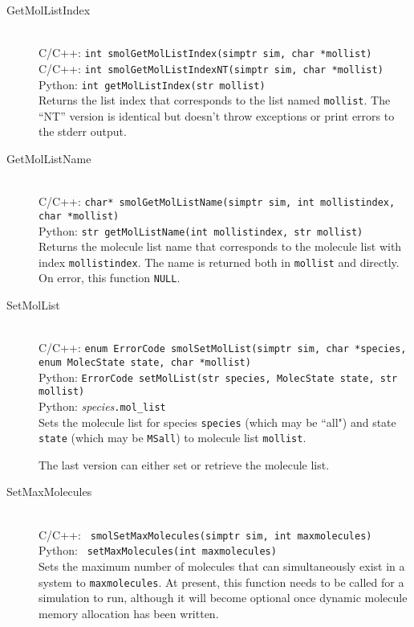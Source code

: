 \documentclass {scrbook}
\newcommand {\ttt} {\texttt}
\begin{document}
\begin{description}
\item[GetMolListIndex]
\hfill \\
C/C++: \ttt{int smolGetMolListIndex(simptr sim, char *mollist)}\\
C/C++: \ttt{int smolGetMolListIndexNT(simptr sim, char *mollist)}\\
Python: \ttt{int getMolListIndex(str mollist)}\\
Returns the list index that corresponds to the list named \ttt{mollist}. The ``NT'' version is identical but doesn't throw exceptions or print errors to the stderr output.

\item[GetMolListName]
\hfill \\
C/C++: \ttt{char* smolGetMolListName(simptr sim, int mollistindex, char *mollist)}\\
Python: \ttt{str getMolListName(int mollistindex, str mollist)}\\
Returns the molecule list name that corresponds to the molecule list with index \ttt{mollistindex}. The name is returned both in \ttt{mollist} and directly. On error, this function \ttt{NULL}.

\item[SetMolList]
\hfill \\
C/C++: \ttt{enum ErrorCode smolSetMolList(simptr sim, char *species, enum MolecState state, char *mollist)}\\
Python: \ttt{ErrorCode setMolList(str species, MolecState state, str mollist)}\\
Python: \textit{species}\ttt{.mol\_list}\\
Sets the molecule list for species \ttt{species} (which may be ``all") and state \ttt{state} (which may be \ttt{MSall}) to molecule list \ttt{mollist}.

The last version can either set or retrieve the molecule list.

\item[SetMaxMolecules]
\hfill \\
C/C++: \ttt{ smolSetMaxMolecules(simptr sim, int maxmolecules)}\\
Python: \ttt{ setMaxMolecules(int maxmolecules)}\\
Sets the maximum number of molecules that can simultaneously exist in a system to \ttt{maxmolecules}. At present, this function needs to be called for a simulation to run, although it will become optional once dynamic molecule memory allocation has been written.


\end{description}
\end{document}

